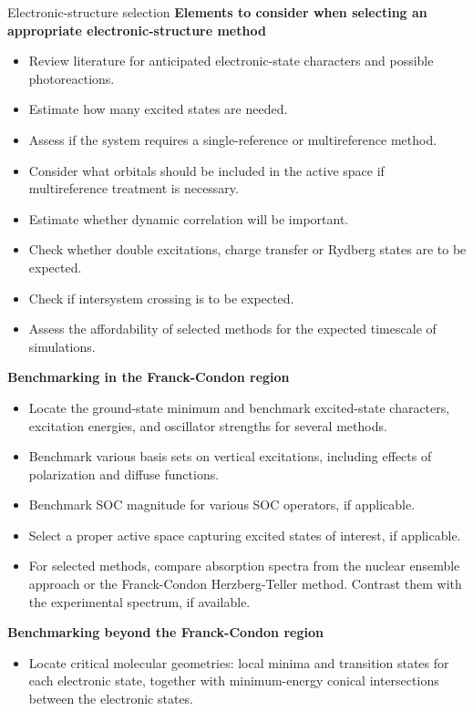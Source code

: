\documentclass[9pt,bestpractices,pubversion]{livecoms}
\begin{document}
\begin{Checklists*}[p!]

\begin{checklist}{Electronic-structure selection}
\textbf{Elements to consider when selecting an appropriate electronic-structure method}
\begin{itemize}
\item Review literature for anticipated electronic-state characters and possible photoreactions.
\item Estimate how many excited states are needed.
\item Assess if the system requires a single-reference or multireference method.
\item Consider what orbitals should be included in the active space if multireference treatment is necessary. 
\item Estimate whether dynamic correlation will be important.
\item Check whether double excitations, charge transfer or Rydberg states are to be expected.
\item Check if intersystem crossing is to be expected.
\item Assess the affordability of selected methods for the expected timescale of simulations.
\end{itemize}
\textbf{Benchmarking in the Franck-Condon region}
\begin{itemize}
\item Locate the ground-state minimum and benchmark excited-state characters, excitation energies, and oscillator strengths for several methods. 
\item Benchmark various basis sets on vertical excitations, including effects of polarization and diffuse functions.
\item Benchmark SOC magnitude for various SOC operators, if applicable.
\item Select a proper active space capturing excited states of interest, if applicable.
\item For selected methods, compare absorption spectra from the nuclear ensemble approach or the Franck-Condon Herzberg-Teller method. Contrast them with the experimental spectrum, if available.
\end{itemize}
\textbf{Benchmarking beyond the Franck-Condon region}
\begin{itemize}
\item Locate critical molecular geometries: local minima and transition states for each electronic state, together with minimum-energy conical intersections between the electronic states.

\end{itemize}
\end{checklist}
\end{Checklists*}
\end{document}

